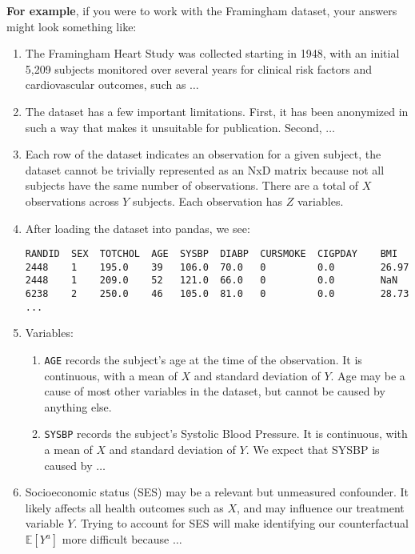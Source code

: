 \documentclass[12pt]{article}
\begin{document}
{\bf For example}, if you were to work with the Framingham dataset, your
answers might look something like:
\begin{enumerate}[itemsep=0em,label={(\alph*)}]
\item The Framingham Heart Study was collected starting in 1948, with an
initial 5,209 subjects monitored over several years for clinical risk factors
and cardiovascular outcomes, such as $\ldots$
\item The dataset has a few important limitations. First, it has been
anonymized in such a way that makes it unsuitable for publication. Second,
$\ldots$
\item Each row of the dataset indicates an observation for a given subject, the
dataset cannot be trivially represented as an NxD matrix because not all
subjects have the same number of observations. There are a total of $X$
observations across $Y$ subjects. Each observation has $Z$ variables. 
\item After loading the dataset into pandas, we see:
\begin{verbatim}
RANDID  SEX  TOTCHOL  AGE  SYSBP  DIABP  CURSMOKE  CIGPDAY    BMI 
2448    1    195.0    39   106.0  70.0   0         0.0        26.97 
2448    1    209.0    52   121.0  66.0   0         0.0        NaN
6238    2    250.0    46   105.0  81.0   0         0.0        28.73
...
\end{verbatim}
\clearpage
\item Variables:
  \begin{enumerate}[itemsep=0em,label={\roman*.}]
     \item {\tt AGE} records the subject's age at the time of the observation.
     It is continuous, with a mean of $X$ and standard deviation of $Y$. Age
     may be a cause of most other variables in the dataset, but cannot be
     caused by anything else.
     \item {\tt SYSBP} records the subject's Systolic Blood Pressure. It is
     continuous, with a mean of $X$ and standard deviation of $Y$. We expect
     that SYSBP is caused by $\ldots$
  \end{enumerate}
\item Socioeconomic status (SES) may be a relevant but unmeasured confounder.
It likely affects all health outcomes such as $X$, and may influence our
treatment variable $Y$. Trying to account for SES will make identifying our
counterfactual $\mathbb{E}[Y^a]$ more difficult because $\ldots$
\end{enumerate}
\end{document}
